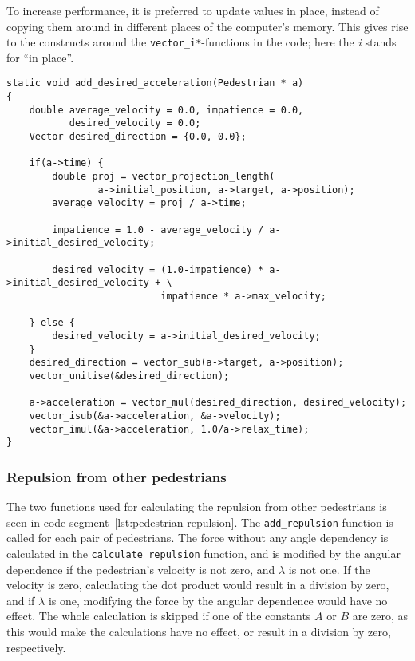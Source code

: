 To increase performance, it is preferred to update values in place, instead of 
copying them around in different places of the computer's memory. This gives 
rise to the constructs around the \texttt{vector\_i*}-functions in the code; 
here the \emph{i} stands for ``in place''.

\begin{lstlisting}[caption={Calculating the desired 
    force.},label=lst:desired-force]
static void add_desired_acceleration(Pedestrian * a)
{
    double average_velocity = 0.0, impatience = 0.0, 
           desired_velocity = 0.0;
    Vector desired_direction = {0.0, 0.0};

    if(a->time) {
        double proj = vector_projection_length(
                a->initial_position, a->target, a->position);
        average_velocity = proj / a->time;

        impatience = 1.0 - average_velocity / a->initial_desired_velocity;

        desired_velocity = (1.0-impatience) * a->initial_desired_velocity + \
                           impatience * a->max_velocity;

    } else {
        desired_velocity = a->initial_desired_velocity;
    }
    desired_direction = vector_sub(a->target, a->position);
    vector_unitise(&desired_direction);

    a->acceleration = vector_mul(desired_direction, desired_velocity);
    vector_isub(&a->acceleration, &a->velocity);
    vector_imul(&a->acceleration, 1.0/a->relax_time);
}
\end{lstlisting}

\subsubsection{Repulsion from other pedestrians}
The two functions used for calculating the repulsion from other pedestrians is seen 
in code segment~\ref{lst:pedestrian-repulsion}. The \texttt{add\_repulsion} function 
is called for each pair of pedestrians. The force without any angle dependency is 
calculated in the \texttt{calculate\_repulsion} function, and is modified by 
the angular dependence if the pedestrian's velocity is not zero, and $\lambda$ is 
not one. If the velocity is zero, calculating the dot product would result in 
a division by zero, and if $\lambda$ is one, modifying the force by the 
angular dependence would have no effect. The whole calculation is skipped if 
one of the constants $A$ or $B$ are zero, as this would make the calculations 
have no effect, or result in a division by zero, respectively.

